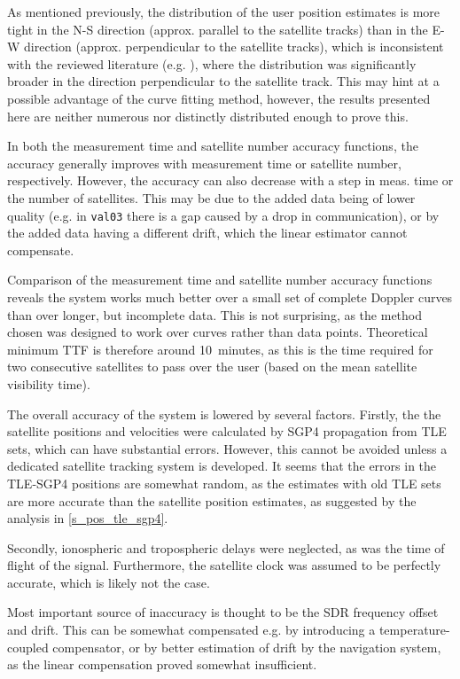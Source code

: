 As mentioned previously, the distribution of the user position estimates is more tight in the N-S direction (approx. parallel to the satellite tracks) than in the E-W direction (approx. perpendicular to the satellite tracks), which is inconsistent with the reviewed literature (e.g. \cite{sop10, sop12}), where the distribution was significantly broader in the direction perpendicular to the satellite track. This may hint at a possible advantage of the curve fitting method, however, the results presented here are neither numerous nor distinctly distributed enough to prove this.

In both the measurement time and satellite number accuracy functions, the accuracy generally improves with measurement time or satellite number, respectively. However, the accuracy can also decrease with a step in meas. time or the number of satellites. This may be due to the added data being of lower quality (e.g. in \texttt{val03} there is a gap caused by a drop in communication), or by the added data having a different drift, which the linear estimator cannot compensate.

Comparison of the measurement time and satellite number accuracy functions reveals the system works much better over a small set of complete Doppler curves than over longer, but incomplete data. This is not surprising, as the method chosen was designed to work over curves rather than data points. Theoretical minimum TTF is therefore around \qty{10}{minutes}, as this is the time required for two consecutive satellites to pass over the user (based on the mean satellite visibility time).

The overall accuracy of the system is lowered by several factors. Firstly, the the satellite positions and velocities were calculated by SGP4 propagation from TLE sets, which can have substantial errors. However, this cannot be avoided unless a dedicated satellite tracking system is developed. It seems that the errors in the TLE-SGP4 positions are somewhat random, as the estimates with old TLE sets are more accurate than the satellite position estimates, as suggested by the analysis in \autoref{s_pos_tle_sgp4}.

Secondly, ionospheric and tropospheric delays were neglected, as was the time of flight of the signal. Furthermore, the satellite clock was assumed to be perfectly accurate, which is likely not the case.

Most important source of inaccuracy is thought to be the SDR frequency offset and drift. This can be somewhat compensated e.g. by introducing a temperature-coupled compensator, or by better estimation of drift by the navigation system, as the linear compensation proved somewhat insufficient.




